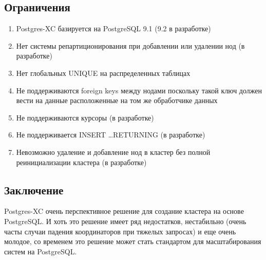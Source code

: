 \subsection{Ограничения}

\begin{enumerate}
\item Postgres-XC базируется на PostgreSQL 9.1 (9.2 в разработке)
\item Нет системы репартиционирования при добавлении или удалении нод (в разработке)
\item Нет глобальных UNIQUE на распределенных таблицах
\item Не поддерживаются foreign keys между нодами поскольку такой ключ должен вести на данные расположенные на том же обработчике данных
\item Не поддерживаются курсоры (в разработке)
\item Не поддерживается INSERT \dots RETURNING (в разработке)
\item Невозможно удаление и добавление нод в кластер без полной реинициализации кластера (в разработке)
\end{enumerate}

\subsection{Заключение}
Postgres-XC очень перспективное решение для создание кластера на основе PostgreSQL. И хоть это решение имеет ряд недостатков, нестабильно (очень часты случаи падения координаторов при тяжелых запросах) и еще очень молодое, со временем это решение может стать стандартом для масштабирования систем на PostgreSQL.